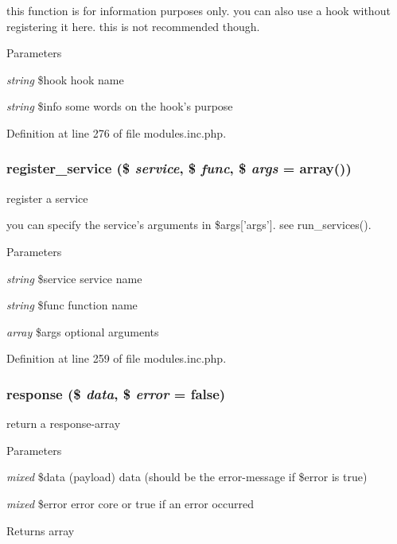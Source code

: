 this function is for information purposes only. you can also use a hook without registering it here. this is not recommended though. 
\begin{DoxyParams}{Parameters}
\item[{\em string}]\$hook hook name \item[{\em string}]\$info some words on the hook's purpose \end{DoxyParams}


Definition at line 276 of file modules.inc.php.

\hypertarget{modules_8inc_8php_ae6ed600fb2ce39a4b0837bbb01fe8d6e}{
\subsubsection[{register\_\-service}]{\setlength{\rightskip}{0pt plus 5cm}register\_\-service (\$ {\em service}, \/  \$ {\em func}, \/  \$ {\em args} = {\ttfamily array()})}}
\label{modules_8inc_8php_ae6ed600fb2ce39a4b0837bbb01fe8d6e}
register a service

you can specify the service's arguments in \$args\mbox{[}'args'\mbox{]}. see run\_\-services(). 
\begin{DoxyParams}{Parameters}
\item[{\em string}]\$service service name \item[{\em string}]\$func function name \item[{\em array}]\$args optional arguments \end{DoxyParams}


Definition at line 259 of file modules.inc.php.

\hypertarget{modules_8inc_8php_a361058ff2a03c098045c4442440a2574}{
\subsubsection[{response}]{\setlength{\rightskip}{0pt plus 5cm}response (\$ {\em data}, \/  \$ {\em error} = {\ttfamily false})}}
\label{modules_8inc_8php_a361058ff2a03c098045c4442440a2574}
return a response-\/array


\begin{DoxyParams}{Parameters}
\item[{\em mixed}]\$data (payload) data (should be the error-\/message if \$error is true) \item[{\em mixed}]\$error error core or true if an error occurred \end{DoxyParams}
\begin{DoxyReturn}{Returns}
array 
\end{DoxyReturn}


